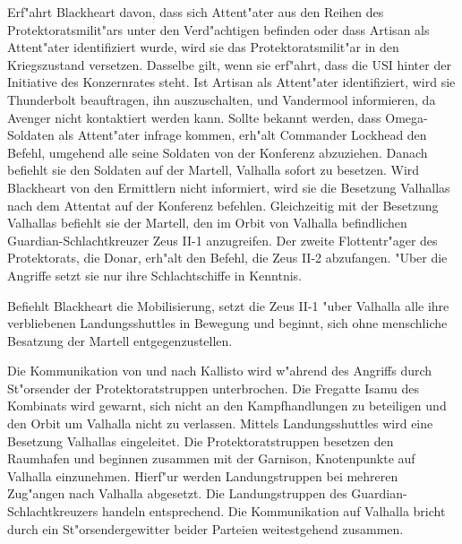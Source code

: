 
Erf"ahrt Blackheart davon, dass sich Attent"ater aus den Reihen des Protektoratsmilit"ars unter den Verd"achtigen befinden oder dass Artisan als Attent"ater identifiziert wurde, wird sie das Protektoratsmilit"ar in den Kriegszustand versetzen. Dasselbe gilt, wenn sie erf"ahrt, dass die USI hinter der Initiative des Konzernrates steht. Ist Artisan als Attent"ater identifiziert, wird sie Thunderbolt beauftragen, ihn auszuschalten, und Vandermool informieren, da Avenger nicht kontaktiert werden kann. Sollte bekannt werden, dass Omega-Soldaten als Attent"ater infrage kommen, erh"alt Commander Lockhead den Befehl, umgehend alle seine Soldaten von der Konferenz abzuziehen. Danach befiehlt sie den Soldaten auf der Martell, Valhalla sofort zu besetzen. Wird Blackheart von den Ermittlern nicht informiert, wird sie die Besetzung Valhallas nach dem Attentat auf der Konferenz befehlen. Gleichzeitig mit der Besetzung Valhallas befiehlt sie der Martell, den im Orbit von Valhalla befindlichen Guardian-Schlachtkreuzer Zeus II-1 anzugreifen. Der zweite Flottentr"ager des Protektorats, die Donar, erh"alt den Befehl, die Zeus II-2 abzufangen. "Uber die Angriffe setzt sie nur ihre Schlachtschiffe in Kenntnis.

Befiehlt Blackheart die Mobilisierung, setzt die Zeus II-1 "uber Valhalla alle ihre verbliebenen Landungsshuttles in Bewegung und beginnt, sich ohne menschliche Besatzung der Martell entgegenzustellen.

Die Kommunikation von und nach Kallisto wird w"ahrend des Angriffs durch St"orsender der Protektoratstruppen unterbrochen. Die Fregatte Isamu des Kombinats wird gewarnt, sich nicht an den Kampfhandlungen zu beteiligen und den Orbit um Valhalla nicht zu verlassen. Mittels Landungsshuttles wird eine Besetzung Valhallas eingeleitet. Die Protektoratstruppen besetzen den Raumhafen und beginnen zusammen mit der Garnison, Knotenpunkte auf Valhalla einzunehmen. Hierf"ur werden Landungstruppen bei mehreren Zug"angen nach Valhalla abgesetzt. Die Landungstruppen des Guardian-Schlachtkreuzers handeln entsprechend. Die Kommunikation auf Valhalla bricht durch ein St"orsendergewitter beider Parteien weitestgehend zusammen. 

